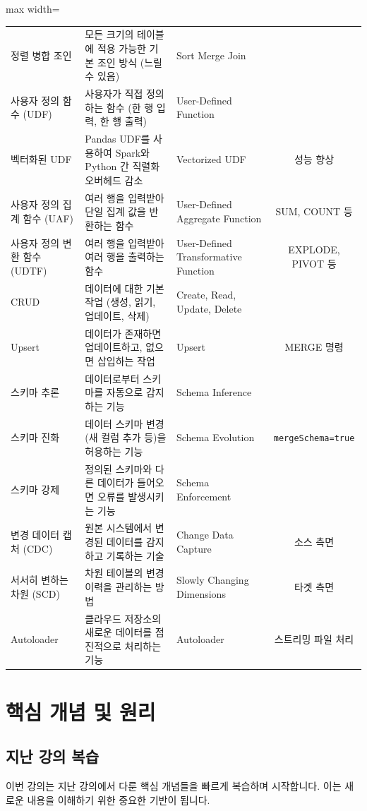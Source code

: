 \documentclass[11pt,a4paper]{article}
\theoremstyle{definition}
\begin{document}
\begin{adjustbox}{max width=\textwidth}
\begin{tabular}{lllc}
정렬 병합 조인 & 모든 크기의 테이블에 적용 가능한 기본 조인 방식 (느릴 수 있음) & Sort Merge Join & \\
사용자 정의 함수 (UDF) & 사용자가 직접 정의하는 함수 (한 행 입력, 한 행 출력) & User-Defined Function & \\
벡터화된 UDF & Pandas UDF를 사용하여 Spark와 Python 간 직렬화 오버헤드 감소 & Vectorized UDF & 성능 향상 \\
사용자 정의 집계 함수 (UAF) & 여러 행을 입력받아 단일 집계 값을 반환하는 함수 & User-Defined Aggregate Function & SUM, COUNT 등 \\
사용자 정의 변환 함수 (UDTF) & 여러 행을 입력받아 여러 행을 출력하는 함수 & User-Defined Transformative Function & EXPLODE, PIVOT 등 \\
CRUD & 데이터에 대한 기본 작업 (생성, 읽기, 업데이트, 삭제) & Create, Read, Update, Delete & \\
Upsert & 데이터가 존재하면 업데이트하고, 없으면 삽입하는 작업 & Upsert & MERGE 명령 \\
스키마 추론 & 데이터로부터 스키마를 자동으로 감지하는 기능 & Schema Inference & \\
스키마 진화 & 데이터 스키마 변경(새 컬럼 추가 등)을 허용하는 기능 & Schema Evolution & \texttt{mergeSchema=true} \\
스키마 강제 & 정의된 스키마와 다른 데이터가 들어오면 오류를 발생시키는 기능 & Schema Enforcement & \\
변경 데이터 캡처 (CDC) & 원본 시스템에서 변경된 데이터를 감지하고 기록하는 기술 & Change Data Capture & 소스 측면 \\
서서히 변하는 차원 (SCD) & 차원 테이블의 변경 이력을 관리하는 방법 & Slowly Changing Dimensions & 타겟 측면 \\
Autoloader & 클라우드 저장소의 새로운 데이터를 점진적으로 처리하는 기능 & Autoloader & 스트리밍 파일 처리 \\
\bottomrule
\end{tabular}
\end{adjustbox}

\newpage
\section{핵심 개념 및 원리}

\subsection{지난 강의 복습}
이번 강의는 지난 강의에서 다룬 핵심 개념들을 빠르게 복습하며 시작합니다. 이는 새로운 내용을 이해하기 위한 중요한 기반이 됩니다.
\end{document}
